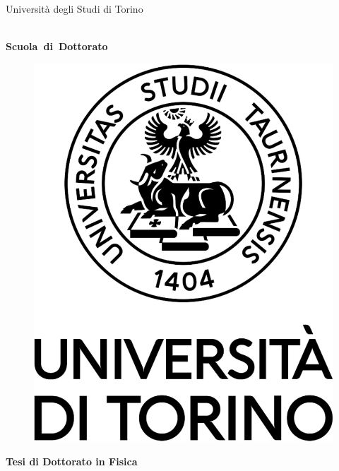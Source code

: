 \begin{titlepage}
\thispagestyle{empty}

\begin{center}

\begin{Large}
Universit\`a degli Studi di Torino
\strut\\
\textbf{Scuola~di~Dottorato}
\end{Large}

\large{\strut}

\vspace{0.5cm}
\begin{figure}[h]
  \centering
  \includegraphics[width=.2\textheight]{Figures/logo_sigillo_verticale_cover.pdf}
\end{figure}

\vspace{1.1cm}

\Large{\textbf{Tesi di Dottorato in Fisica}}

\vspace{2cm}

\LARGE{\textbf{\thetitle}}\\

\vspace{4cm}

\Large{\textbf{\theauthor}}

\vspace*{\fill}

\end{center}
\end{titlepage}
